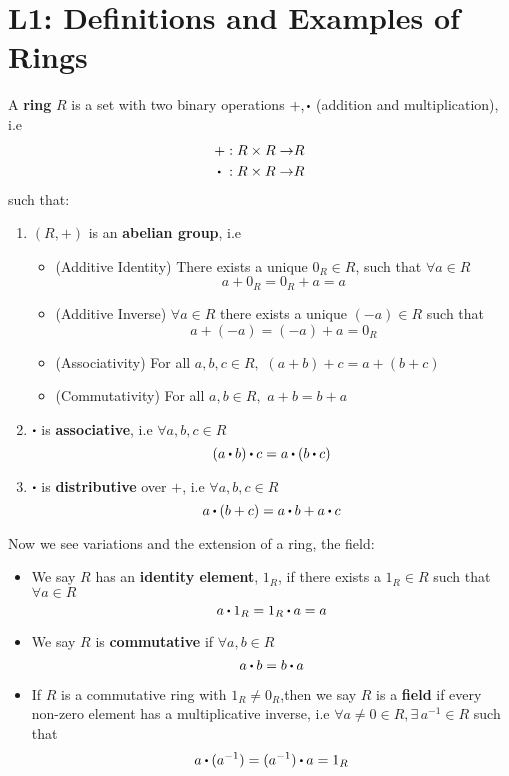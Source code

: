 \documentclass[../Main.tex]{subfiles}
\begin{document}
\chapter{L1: Definitions and Examples of Rings}
\begin{dfn}[title= Rings and Fields]
	A \textbf{ring} $R$ is a set with two binary operations $+,\rdot$ (addition and multiplication), i.e 
	\begin{align*}
		+: R \times R \to &R \\
		\rdot \hspace{3pt}: R \times R \to &R 
	\end{align*}
such that:
\begin{enumerate}
	\item $(R,+)$ is an \textbf{abelian group}, i.e
	\begin{itemize}
		\item (Additive Identity) There exists a unique $0_R \in R$, such that $\forall a \in R$ \[a+0_R=0_R+a=a\]
		\item (Additive Inverse) $\forall a\in R$ there exists a unique $(-a) \in R$ such that
		\[a+(-a)=(-a)+a=0_R\]
		\item (Associativity) For all $a,b,c \in R, \,\, (a+b)+c=a+(b+c)$
		\item
		(Commutativity) For all $a,b\in R,\,\, a+b=b+a$
	\end{itemize} 
	\item $\rdot$ is \textbf{associative}, i.e  $\forall a,b,c\in R$
	\[(a\rdot b)\rdot c = a\rdot (b\rdot c)\]
	\item $\rdot$ is \textbf{distributive} over $+$, i.e $\forall a,b,c\in R$
	\[a\rdot(b+c)=a\rdot b+a\rdot c\]
\end{enumerate}
Now we see variations and the extension of a ring, the field:
\begin{itemize}
	\item We say $R$ has an \textbf{identity element}, $1_R$, if there exists a $1_R \in R$ such that $\forall a \in R$
	\[a\rdot 1_R =1_R \rdot a = a\]
	\item We say $R$ is \textbf{commutative} if $\forall a,b \in R$
	\[a\rdot b=b\rdot a\]	
	\item If $R$ is a commutative ring with $1_R \ne 0_R$,then we say $R$ is a \textbf{field} if every non-zero element has a multiplicative inverse, i.e $\forall a\ne0 \in R, \exists\, a^{-1}\in R$ such that
	\[ a\rdot(a^{-1})=(a^{-1})\rdot a = 1_R \]
\end{itemize}
\end{dfn}
\end{document}

